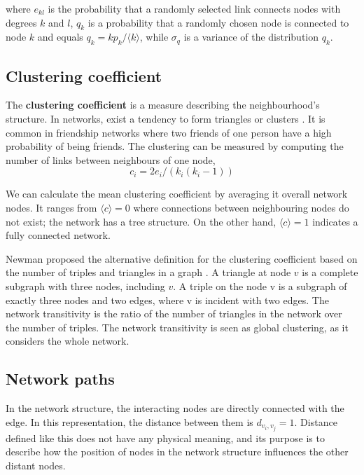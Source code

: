 where $e_{kl}$ is the probability that a randomly selected link connects nodes with degrees $k$ and $l$, $q_k$ is a probability that a randomly chosen node is connected to node $k$ and equals $q_k = kp_k / \langle k \rangle$, while $\sigma_q$ is a variance of the distribution $q_k$. 

\subsection{Clustering coefficient}

The \textbf{clustering coefficient} is a measure describing the neighbourhood's structure. In networks, exist a tendency to form triangles or clusters \cite{barabasi2016network}. It is common in friendship networks where two friends of one person have a high probability of being friends.%
The clustering can be measured by computing the number of links between neighbours of one node,
\begin{equation}
c_i=2e_i/(k_i(k_i-1))
\end{equation}

We can calculate the mean clustering coefficient by averaging it overall network nodes. It ranges from  $\langle c \rangle = 0$ where connections between neighbouring nodes do not exist; the network has a tree structure. On the other hand, $\langle c \rangle = 1$ indicates a fully connected network. 

Newman proposed the alternative definition for the clustering coefficient based on the number of triples and triangles in a graph \cite{newman2009random}. A triangle at node $v$ is a complete subgraph with three nodes, including $v$. A triple on the node v is a subgraph of exactly three nodes and two edges, where v is incident with two edges. The network transitivity is the ratio of the number of triangles in the network over the number of triples. The network transitivity is seen as global clustering, as it considers the whole network.  

\subsection{Network paths} %
In the network structure, the interacting nodes are directly connected with the edge. In this representation, the distance between them is $d_{v_i, v_j} =1 $. Distance defined like this does not have any physical meaning, and its purpose is to describe how the position of nodes in the network structure influences the other distant nodes. 


